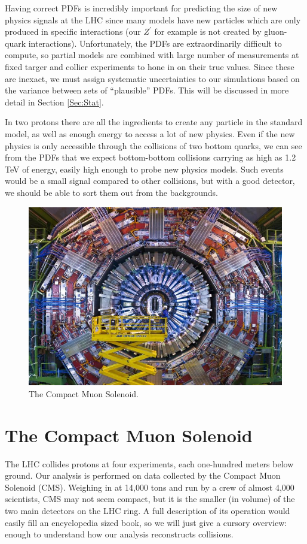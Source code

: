 Having correct PDFs is incredibly important for predicting the size of new physics signals at the LHC since many models have new particles which are only produced in specific interactions (our $Z^\prime$ for example is not created by gluon-quark interactions). Unfortunately, the PDFs are extraordinarily difficult to compute, so partial models are combined with large number of measurements at fixed targer and collier experiments to hone in on their true values. Since these are inexact, we must assign systematic uncertainties to our simulations based on the variance between sets of ``plausible'' PDFs. This will be discussed in more detail in Section \ref{Sec:Stat}.

In two protons there are all the ingredients to create any particle in the standard model, as well as enough energy to access a lot of new physics. Even if the new physics is only accessible through the collisions of two bottom quarks, we can see from the PDFs that we expect bottom-bottom collisions carrying as high as 1.2 TeV of energy, easily high enough to probe new physics models. Such events would be a small signal compared to other collisions, but with a good detector, we should be able to sort them out from the backgrounds.
\begin{figure}[h!]
    \centering
        \includegraphics[width=\textwidth]{F3/cms_0}
        \caption{The Compact Muon Solenoid.}
        \label{Fig:CMS:cms}
\end{figure}
\section{The Compact Muon Solenoid}
The LHC collides protons at four experiments, each one-hundred meters below ground. Our analysis is performed on data collected by the Compact Muon Solenoid (CMS)\cite{Bayatian:922757}. Weighing in at 14,000 tons and run by a crew of almost 4,000 scientists, CMS may not seem compact, but it is the smaller (in volume) of the two main detectors on the LHC ring. A full description of its operation would easily fill an encyclopedia sized book, so we will just give a cursory overview: enough to understand how our analysis reconstructs collisions.

